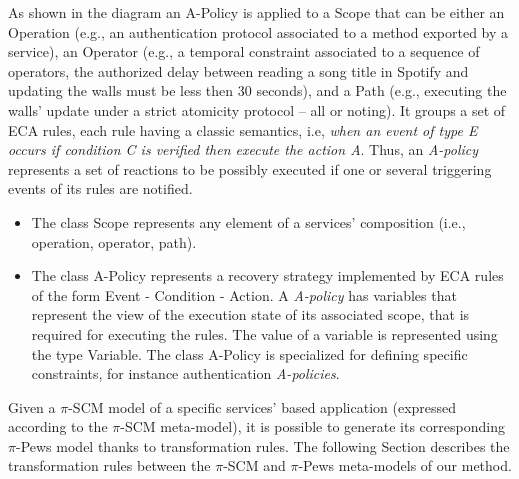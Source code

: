 As shown in the diagram an {\sc A-Policy} is applied to a {\sc Scope} that can be either an {\sc Operation} (e.g., an authentication protocol associated to a method exported by a service),  an {\sc Operator} (e.g., a temporal constraint associated to a sequence of operators, the authorized delay between reading a song title in Spotify and updating the walls must be less then 30 seconds), and a {\sc Path} (e.g., executing the walls' update under a strict atomicity protocol -- all or noting).  It groups a set of ECA rules, each rule having a classic semantics, i.e, {\em when an event of type E occurs if  condition C is verified then execute the action A}.  Thus, an {\em A-policy} represents a set of reactions to be possibly executed if one or several triggering events of its rules are notified.
\begin{itemize}
\item The class {\sc Scope} represents any element of a services' composition (i.e., operation, operator, path).
\item The class {\sc A-Policy} represents a recovery strategy implemented by ECA rules of the form {\sc Event} - {\sc Condition} - {\sc Action}. A {\em A-policy} has variables that represent the view of the execution state of its associated scope, that is required for executing the rules. The value of a variable is represented using the type {\sc Variable}. The class {\sc A-Policy} is specialized for defining specific constraints, for instance authentication {\em A-policies}.
\end{itemize}

%

Given a $\pi$-SCM model of a specific services' based application (expressed according to the $\pi$-SCM meta-model), it is possible to generate its corresponding $\pi$-{\sc Pews} model thanks to transformation rules. The following Section describes the transformation rules between the $\pi$-SCM and $\pi$-{\sc Pews} meta-models of our method.



